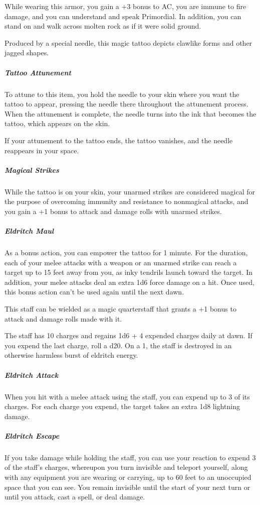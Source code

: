 \documentclass[10pt,a4paper,twoside,bg=print,twocolumn,openany,nodeprecatedcode]{dndbook}
\begin{document}
While wearing this armor, you gain a +3 bonus to AC, you are immune to fire damage, and you can understand and speak Primordial. In addition, you can stand on and walk across molten rock as if it were solid ground.

Produced by a special needle, this magic tattoo depicts clawlike forms and other jagged shapes.

\subparagraph{Tattoo Attunement}
To attune to this item, you hold the needle to your skin where you want the tattoo to appear, pressing the needle there throughout the attunement process. When the attunement is complete, the needle turns into the ink that becomes the tattoo, which appears on the skin.

If your attunement to the tattoo ends, the tattoo vanishes, and the needle reappears in your space.

\subparagraph{Magical Strikes}
While the tattoo is on your skin, your unarmed strikes are considered magical for the purpose of overcoming immunity and resistance to nonmagical attacks, and you gain a +1 bonus to attack and damage rolls with unarmed strikes.

\subparagraph{Eldritch Maul}
As a bonus action, you can empower the tattoo for 1 minute. For the duration, each of your melee attacks with a weapon or an unarmed strike can reach a target up to 15 feet away from you, as inky tendrils launch toward the target. In addition, your melee attacks deal an extra 1d6 force damage on a hit. Once used, this bonus action can't be used again until the next dawn.

This staff can be wielded as a magic quarterstaff that grants a +1 bonus to attack and damage rolls made with it.

The staff has 10 charges and regains 1d6 + 4 expended charges daily at dawn. If you expend the last charge, roll a d20. On a 1, the staff is destroyed in an otherwise harmless burst of eldritch energy.

\subparagraph{Eldritch Attack}
When you hit with a melee attack using the staff, you can expend up to 3 of its charges. For each charge you expend, the target takes an extra 1d8 lightning damage.

\subparagraph{Eldritch Escape}
If you take damage while holding the staff, you can use your reaction to expend 3 of the staff's charges, whereupon you turn invisible and teleport yourself, along with any equipment you are wearing or carrying, up to 60 feet to an unoccupied space that you can see. You remain invisible until the start of your next turn or until you attack, cast a spell, or deal damage.
\end{document}
